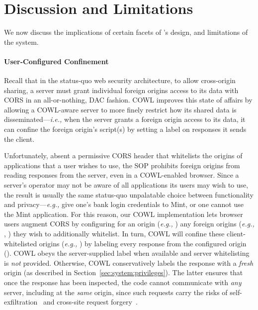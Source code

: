 \section{Discussion and Limitations}
\label{sec:discussion}

We now discuss the implications of certain facets of \sys{}'s
design, and limitations of the system.


\paragraph{User-Configured Confinement}
Recall that in the status-quo web security architecture,
to allow cross-origin sharing, a server must
grant individual foreign origins access to its data with CORS in
an all-or-nothing, DAC fashion.
%
COWL improves this state of affairs by allowing a COWL-aware server to
more finely restrict how its shared data is
disseminated---\emph{i.e.,} when the server grants a foreign origin
access to its data, it can confine the foreign origin's script(s) by
setting a label on responses it sends the client.

Unfortunately, absent a permissive CORS header that whitelists the
origins of applications that a user wishes to use, the SOP
prohibits foreign origins from reading responses from the server,
even in a COWL-enabled browser.
%
Since a server's operator may not be aware of all applications its
users may wish to use, the result is usually the same status-quo
unpalatable choice between functionality and privacy---\emph{e.g.,} give
one's bank login credentials to Mint, or one cannot use the Mint
application.
%
For this reason, our COWL implementation lets browser users augment
CORS by configuring for an origin (\emph{e.g.,} ) any
foreign origins (\emph{e.g.,} , )
they wish to additionally whitelist.
%
In turn, COWL will confine these client-whitelisted origins (\emph{e.g.,}
) by labeling every response from the configured
origin ().
%
COWL obeys the server-supplied label when available and server
whitelisting is \emph{not} provided. Otherwise, COWL conservatively
labels the response with a \emph{fresh} origin (as described in
Section~\ref{sec:system:privileges}). The latter ensures that once the
response has been inspected, the code cannot communicate with
\emph{any} server, including at the \emph{same} origin, since such
requests carry the risks of self-exfiltration~\cite{selfex} and
cross-site request forgery~\cite{CSRF}.
%


